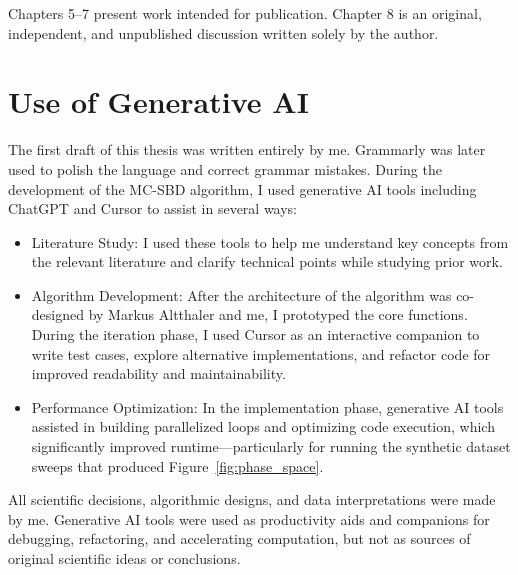 Chapters 5–7 present work intended for publication. Chapter 8 is an original, independent, and unpublished discussion written solely by the author.
 

\section{Use of Generative AI}
The first draft of this thesis was written entirely by me. Grammarly was later used to polish the language and correct grammar mistakes. During the development of the \ac{MC-SBD} algorithm, I used generative AI tools including ChatGPT and Cursor to assist in several ways:
\begin{itemize}
	\item Literature Study: I used these tools to help me understand key concepts from the relevant literature and clarify technical points while studying prior work.
	\item Algorithm Development: After the architecture of the algorithm was co-designed by Markus Altthaler and me, I prototyped the core functions. During the iteration phase, I used Cursor as an interactive companion to write test cases, explore alternative implementations, and refactor code for improved readability and maintainability.
	\item Performance Optimization: In the implementation phase, generative AI tools assisted in building parallelized loops and optimizing code execution, which significantly improved runtime—particularly for running the synthetic dataset sweeps that produced Figure~\ref{fig:phase_space}.
\end{itemize}
All scientific decisions, algorithmic designs, and data interpretations were made by me. Generative AI tools were used as productivity aids and companions for debugging, refactoring, and accelerating computation, but not as sources of original scientific ideas or conclusions.